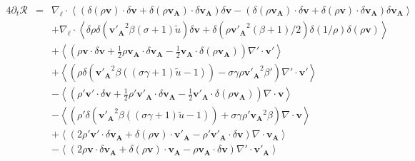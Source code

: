 \begin{equation}
\boxed{
\begin{array}{lcl}
\label{eq:turb_pol_khm3}\quad 4\partial_t \mathcal{R} &=& \nabla_{\boldsymbol{\ell}} \cdot \left<\left(\delta \left(\rho\boldsymbol{v}\right) \cdot \delta \boldsymbol{v}+ \delta \left(\rho\boldsymbol{v_A}\right) \cdot \delta \boldsymbol{v_A}\right) \delta \boldsymbol{v}  -\left(\delta \left(\rho\boldsymbol{v_A}\right) \cdot \delta \boldsymbol{v}  + \delta \left(\rho\boldsymbol{v}\right) \cdot \delta \boldsymbol{v_A}  \right) \delta \boldsymbol{v_A} \right>\\%
&& + \nabla_{\boldsymbol{\ell}} \cdot \left< \delta \rho \delta \left(\boldsymbol{v'_A}^2\beta\left(\sigma+1\right)\tilde{u}\right) \delta \boldsymbol{v}+ \delta \left(\rho\boldsymbol{v'_A}^2\left(\beta +1\right)/2\right)  \delta \left(1/\rho\right) \delta\left(\rho \boldsymbol{v}\right) \right> \\ %
&& +\left< \left(\rho \boldsymbol{v} \cdot \delta \boldsymbol{v} +\frac{1}{2} \rho \boldsymbol{v_A} \cdot \delta \boldsymbol{v_A} -\frac{1}{2} \boldsymbol{v_A} \cdot \delta \left(\rho \boldsymbol{v_A}\right)\right) \nabla' \cdot \boldsymbol{v'} \right>\\%
&& +\left< \left( \rho \delta \left(\boldsymbol{v'_A}^2\beta\left(\left(\sigma\gamma+1\right)\tilde{u} - 1\right)\right) -  \sigma \gamma \rho \boldsymbol{v'_A}^2\beta'\right) \nabla' \cdot \boldsymbol{v'} \right>\\%
&& -\left<\left( \rho' \boldsymbol{v'} \cdot \delta \boldsymbol{v} +\frac{1}{2} \rho' \boldsymbol{v'_A} \cdot \delta \boldsymbol{v_A} -\frac{1}{2} \boldsymbol{v'_A} \cdot \delta \left(\rho \boldsymbol{v_A}\right)\right) \nabla \cdot \boldsymbol{v} \right>\\%
&& -\left< \left( \rho' \delta \left(\boldsymbol{v'_A}^2\beta\left(\left(\sigma\gamma+1\right)\tilde{u} - 1\right)\right) +  \sigma \gamma \rho'\boldsymbol{v_A}^2\beta \right)\nabla \cdot \boldsymbol{v}\right>\\%
&&+ \left<\left(2 \rho' \boldsymbol{v'} \cdot \delta \boldsymbol{v_A}+ \delta\left(\rho \boldsymbol{v}\right) \cdot \boldsymbol{v'_A} - \rho' \boldsymbol{v'_A} \cdot \delta \boldsymbol{v}  \right)\nabla \cdot \boldsymbol{v_A}\right>\\%
&&- \left<\left(2\rho \boldsymbol{v} \cdot \delta \boldsymbol{v_A} + \delta\left(\rho \boldsymbol{v}\right) \cdot \boldsymbol{v_A} - \rho \boldsymbol{v_A} \cdot \delta \boldsymbol{v}  \right)\nabla' \cdot \boldsymbol{v'_A}\right> \\%

\end{array}}
\end{equation}
